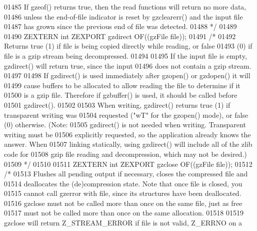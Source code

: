 \begin{DoxyCode}
01485 \textcolor{comment}{     If gzeof() returns true, then the read functions will return no more data,}
01486 \textcolor{comment}{   unless the end-of-file indicator is reset by gzclearerr() and the input file}
01487 \textcolor{comment}{   has grown since the previous end of file was detected.}
01488 \textcolor{comment}{*/}
01489 
01490 ZEXTERN \textcolor{keywordtype}{int} ZEXPORT gzdirect OF((gzFile file));
01491 \textcolor{comment}{/*}
01492 \textcolor{comment}{     Returns true (1) if file is being copied directly while reading, or false}
01493 \textcolor{comment}{   (0) if file is a gzip stream being decompressed.}
01494 \textcolor{comment}{}
01495 \textcolor{comment}{     If the input file is empty, gzdirect() will return true, since the input}
01496 \textcolor{comment}{   does not contain a gzip stream.}
01497 \textcolor{comment}{}
01498 \textcolor{comment}{     If gzdirect() is used immediately after gzopen() or gzdopen() it will}
01499 \textcolor{comment}{   cause buffers to be allocated to allow reading the file to determine if it}
01500 \textcolor{comment}{   is a gzip file.  Therefore if gzbuffer() is used, it should be called before}
01501 \textcolor{comment}{   gzdirect().}
01502 \textcolor{comment}{}
01503 \textcolor{comment}{     When writing, gzdirect() returns true (1) if transparent writing was}
01504 \textcolor{comment}{   requested ("wT" for the gzopen() mode), or false (0) otherwise.  (Note:}
01505 \textcolor{comment}{   gzdirect() is not needed when writing.  Transparent writing must be}
01506 \textcolor{comment}{   explicitly requested, so the application already knows the answer.  When}
01507 \textcolor{comment}{   linking statically, using gzdirect() will include all of the zlib code for}
01508 \textcolor{comment}{   gzip file reading and decompression, which may not be desired.)}
01509 \textcolor{comment}{*/}
01510 
01511 ZEXTERN \textcolor{keywordtype}{int} ZEXPORT    gzclose OF((gzFile file));
01512 \textcolor{comment}{/*}
01513 \textcolor{comment}{     Flushes all pending output if necessary, closes the compressed file and}
01514 \textcolor{comment}{   deallocates the (de)compression state.  Note that once file is closed, you}
01515 \textcolor{comment}{   cannot call gzerror with file, since its structures have been deallocated.}
01516 \textcolor{comment}{   gzclose must not be called more than once on the same file, just as free}
01517 \textcolor{comment}{   must not be called more than once on the same allocation.}
01518 \textcolor{comment}{}
01519 \textcolor{comment}{     gzclose will return Z\_STREAM\_ERROR if file is not valid, Z\_ERRNO on a}

\end{DoxyCode}
